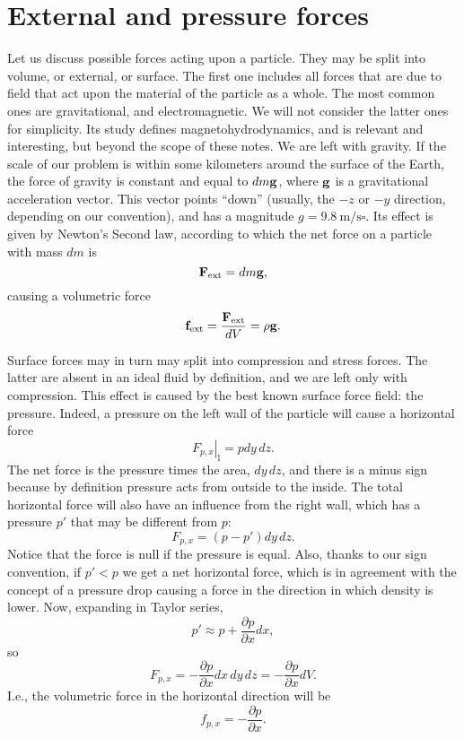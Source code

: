 \section{External and pressure forces}
\label{sec:pressure_forces}

Let us discuss possible forces acting upon a particle. They may be
split into volume, or external, or surface. The first one includes all
forces that are due to field that act upon the material of the
particle as a whole. The most common ones are gravitational, and
electromagnetic. We will not consider the latter ones for
simplicity. Its study defines magnetohydrodynamics, and is relevant
and interesting, but beyond the scope of these notes. We are left with
gravity. If the scale of our problem is within some kilometers around
the surface of the Earth, the force of gravity is constant and equal
to $dm \mathbf{g}$, where $\mathbf{g}$ is a gravitational acceleration
vector. This vector points ``down'' (usually, the $-z$ or $-y$
direction, depending on our convention), and has a magnitude
$g=\SI{9.8}{\meter\per\second\square}$. Its effect is given by
Newton's Second law, according to which the net force on a particle
with mass $dm$ is
\[
\mathbf{F}_\text{ext} = dm \mathbf{g} ,
\]
causing a volumetric force
\[
\mathbf{f}_\text{ext} = \frac{\mathbf{F}_\text{ext}}{dV}= \rho \mathbf{g} .
\]

Surface forces may in turn may split into compression and stress
forces. The latter are absent in an ideal fluid by definition, and we
are left only with compression. This effect is caused by the best
known surface force field: the pressure. Indeed, a pressure on the
left wall of the particle will cause a horizontal force
\begin{equation}
  \label{eq:pressure_force_on_left}
  \left. F_{p,x} \right|_\text{l} =
  p  dy\, dz .
\end{equation}
The net force is the pressure times the area, $dy\,dz$, and there is a
minus sign because by definition pressure acts from outside to the
inside. The total horizontal force will also have an influence from the
right wall, which has a pressure $p'$ that may be different from $p$:
\[
F_{p,x} =  (p - p')  dy\, dz .
\]
Notice that the force is null if the pressure is equal. Also, thanks
to our sign convention, if $p'<p$ we get a net horizontal force, which
is in agreement with the concept of a pressure drop causing a force in
the direction in which density is lower. Now, expanding in Taylor
series,
\[
p' \approx p + \frac{\partial p }{ \partial x} dx ,
\]
so
\[
F_{p,x} =
-  \frac{\partial p }{ \partial x}  dx\, dy\, dz =
-  \frac{\partial p }{ \partial x}  dV .
\]
I.e., the volumetric force in the horizontal direction will be
\[
f_{p,x} = -  \frac{\partial p }{ \partial x} .
\]

